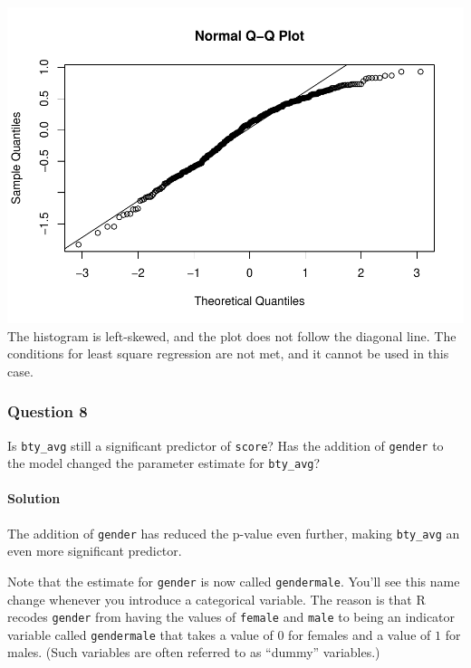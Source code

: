 \documentclass[]{article}
\newenvironment{Shaded}{\begin{snugshade}}{\end{snugshade}}
\newcommand{\KeywordTok}[1]{\textcolor[rgb]{0.13,0.29,0.53}{\textbf{#1}}}
\newcommand{\OperatorTok}[1]{\textcolor[rgb]{0.81,0.36,0.00}{\textbf{#1}}}
\newcommand{\NormalTok}[1]{#1}
\let\oldparagraph\paragraph
\renewcommand{\paragraph}[1]{\oldparagraph{#1}\mbox{}}
\begin{document}
\begin{Shaded}
\end{Shaded}

\includegraphics{multiple_regression_files/figure-latex/quest-7-3.pdf}
The histogram is left-skewed, and the plot does not follow the diagonal
line. The conditions for least square regression are not met, and it
cannot be used in this case.

\subsubsection{Question 8}\label{question-8}

Is \texttt{bty\_avg} still a significant predictor of \texttt{score}?
Has the addition of \texttt{gender} to the model changed the parameter
estimate for \texttt{bty\_avg}?

\paragraph{Solution}\label{solution-7}

The addition of \texttt{gender} has reduced the p-value even further,
making \texttt{bty\_avg} an even more significant predictor.

Note that the estimate for \texttt{gender} is now called
\texttt{gendermale}. You'll see this name change whenever you introduce
a categorical variable. The reason is that R recodes \texttt{gender}
from having the values of \texttt{female} and \texttt{male} to being an
indicator variable called \texttt{gendermale} that takes a value of
\(0\) for females and a value of \(1\) for males. (Such variables are
often referred to as ``dummy'' variables.)
\end{document}
